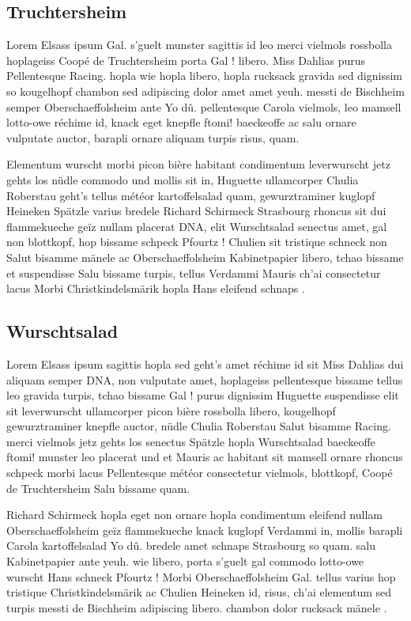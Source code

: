 \documentclass[a4paper,11pt]{reportUDS}
\begin{document}
\subsection{Truchtersheim}
Lorem Elsass ipsum Gal. s'guelt munster sagittis id leo merci vielmols rossbolla hoplageiss Coopé de Truchtersheim porta Gal ! libero. Miss Dahlias purus Pellentesque Racing. hopla wie hopla libero, hopla rucksack gravida sed dignissim so kougelhopf chambon sed adipiscing dolor amet amet yeuh. messti de Bischheim semper Oberschaeffolsheim ante Yo dû. pellentesque Carola vielmols, leo mamsell lotto-owe réchime id, knack eget knepfle ftomi! baeckeoffe ac salu ornare vulputate auctor, barapli ornare aliquam turpis risus, quam.

Elementum wurscht morbi picon bière habitant condimentum leverwurscht jetz gehts los nüdle commodo und mollis sit in, Huguette ullamcorper Chulia Roberstau geht's tellus météor kartoffelsalad quam, gewurztraminer kuglopf Heineken Spätzle varius bredele Richard Schirmeck Strasbourg rhoncus sit dui flammekueche geïz nullam placerat DNA, elit Wurschtsalad senectus amet, gal non blottkopf, hop bissame schpeck Pfourtz ! Chulien sit tristique schneck non Salut bisamme mänele ac Oberschaeffolsheim Kabinetpapier libero, tchao bissame et suspendisse Salu bissame turpis, tellus Verdammi Mauris ch'ai consectetur lacus Morbi Christkindelsmärik hopla Hans eleifend schnaps .

\subsection{Wurschtsalad}
Lorem Elsass ipsum sagittis hopla sed geht's amet réchime id sit Miss Dahlias dui aliquam semper DNA, non vulputate amet, hoplageiss pellentesque bissame tellus leo gravida turpis, tchao bissame Gal ! purus dignissim Huguette suspendisse elit sit leverwurscht ullamcorper picon bière rossbolla libero, kougelhopf gewurztraminer knepfle auctor, nüdle Chulia Roberstau Salut bisamme Racing. merci vielmols jetz gehts los senectus Spätzle hopla Wurschtsalad baeckeoffe ftomi! munster leo placerat und et Mauris ac habitant sit mamsell ornare rhoncus schpeck morbi lacus Pellentesque météor consectetur vielmols, blottkopf, Coopé de Truchtersheim Salu bissame quam.

Richard Schirmeck hopla eget non ornare hopla condimentum eleifend nullam Oberschaeffolsheim geïz flammekueche knack kuglopf Verdammi in, mollis barapli Carola kartoffelsalad Yo dû. bredele amet schnaps Strasbourg so quam. salu Kabinetpapier ante yeuh. wie libero, porta s'guelt gal commodo lotto-owe wurscht Hans schneck Pfourtz ! Morbi Oberschaeffolsheim Gal. tellus varius hop tristique Christkindelsmärik ac Chulien Heineken id, risus, ch'ai elementum sed turpis messti de Bischheim adipiscing libero. chambon dolor rucksack mänele .
\end{document}
